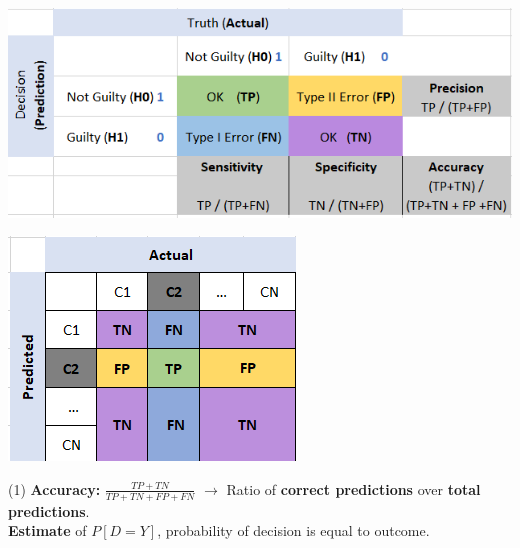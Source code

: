 \documentclass[letterpaper, 10.5pt,landscape]{article}
\begin{document}
\begin{multicols*}{3}
\begin{center}
    \begin{minipage}{\linewidth}
        \includegraphics[width=\textwidth]{figures/Confusion_Matrix_2.PNG}
    \end{minipage}
\end{center}

\begin{center}
    \begin{minipage}{0.56\linewidth}
        \includegraphics[width=\textwidth]{figures/confusion_matrix_multi_class.PNG}
    \end{minipage}
\end{center}



(1) \textbf{Accuracy: } $\boxed{\frac{TP + TN}{TP + TN + FP + FN}}$ $\rightarrow$ Ratio of \textbf{correct predictions} over \textbf{total predictions}. \\
    \textbf{Estimate} of $\boxed{P[D=Y]}$,  probability of decision is equal to outcome.


\end{multicols*}
\end{document}
